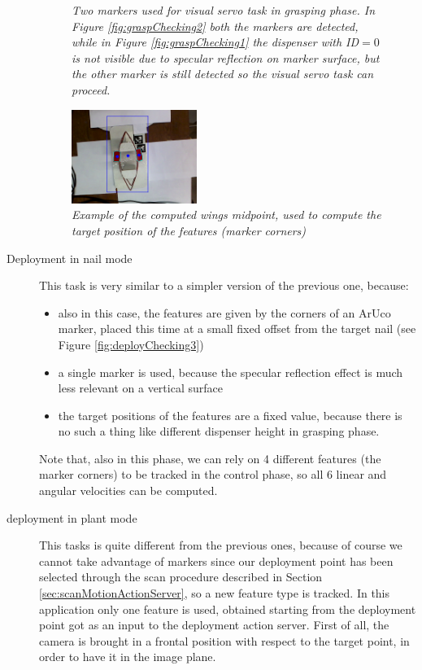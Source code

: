 \begin{description}
\begin{figure}
	\caption{\textit{Two markers used for visual servo task in grasping phase. In Figure \ref{fig:graspChecking2} both the markers are detected, while in Figure \ref{fig:graspChecking1} the dispenser with ID$=0$ is not visible due to specular reflection on marker surface, but the other marker is still detected so the visual servo task can proceed.}}
	\label{fig:twoMarkersControl}
\end{figure}


\begin{figure}
	\centering
	\includegraphics[width=0.4\textwidth]{Images/arm/depth_estimation_2.png}
	\caption{\textit{Example of the computed wings midpoint, used to compute the target position of the features (marker corners)}}
	\label{fig:computedFeatures}
\end{figure}

	\item[Deployment in nail mode] This task is very similar to a simpler version of the previous one, because:
	\begin{itemize}
		\item also in this case, the features are given by the corners of an ArUco marker, placed this time at a small fixed offset from the target nail (see Figure \ref{fig:deployChecking3})
		\item a single marker is used, because the specular reflection effect is much less relevant on a vertical surface 
		\item the target positions of the features are a fixed value, because there is no such a thing like different dispenser height in grasping phase.
	\end{itemize}
	Note that, also in this phase, we can rely on 4 different features (the marker corners) to be tracked in the control phase, so all 6 linear and angular velocities can be computed.
	
\item[deployment in plant mode] This tasks is quite different from the previous ones, because of course we cannot take advantage of markers since our deployment point has been selected through the scan procedure described in Section \ref{sec:scanMotionActionServer}, so a new feature type is tracked. In this application only one feature is used, obtained starting from the deployment point got as an input to the deployment action server. First of all, the camera is brought in a frontal position with respect to the target point, in order to have it in the image plane. 

	
\end{description}



